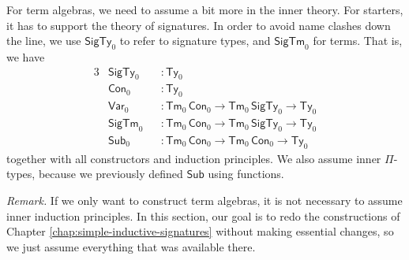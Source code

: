 \documentclass[12pt,a4paper,twoside,openany]{book}
\theoremstyle{remark}
\theoremstyle{definition}
\theoremstyle{theorem}
\newcommand{\ms}[1]{\mathsf{#1}}
\newcommand{\Con}{\mathsf{Con}}
\newcommand{\Sub}{\mathsf{Sub}}
\newcommand{\Tm}{\mathsf{Tm}}
\newcommand{\Ty}{\mathsf{Ty}}
\newcommand{\SigTy}{\mathsf{SigTy}}
\newcommand{\SigTm}{\mathsf{SigTm}}
\newcommand{\Var}{\ms{Var}}
\begin{document}
For term algebras, we need to assume a bit more in the inner theory. For
starters, it has to support the theory of signatures. In order to avoid name
clashes down the line, we use $\SigTy_0$ to refer to signature types, and
$\SigTm_0$ for terms. That is, we have
\begin{alignat*}{3}
  & \SigTy_0  &&: \Ty_0\\
  & \Con_0   &&: \Ty_0\\
  & \Var_0   &&: \Tm_0\,\Con_0 \to \Tm_0\,\SigTy_0 \to \Ty_0\\
  & \SigTm_0 &&: \Tm_0\,\Con_0 \to \Tm_0\,\SigTy_0 \to \Ty_0\\
  & \Sub_0   &&: \Tm_0\,\Con_0 \to \Tm_0\,\Con_0 \to \Ty_0
\end{alignat*}
together with all constructors and induction principles. We also assume inner
$\Pi$-types, because we previously defined $\Sub$ using functions.

\emph{Remark.} If we only want to construct term algebras, it is not necessary
to assume inner induction principles. In this section, our goal is to redo the
constructions of Chapter \ref{chap:simple-inductive-signatures} without making
essential changes, so we just assume everything that was available there.
\end{document}
